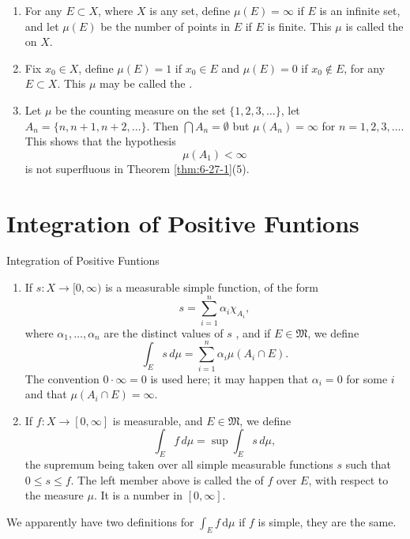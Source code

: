 \documentclass[../main.tex]{subfiles}
\begin{document}
\begin{example}{}{}
    \begin{enumerate}
\item For any $E \subset X$, where $X$ is any set, define $\mu(E) = \infty$ if $E$ is an infinite set, and let $\mu(E)$ be the number of points in $E$ if $E$ is finite. This $\mu$ is called the  on $X$.
\item Fix $x_0 \in X$, define $\mu(E) = 1$ if $x_0 \in E$ and $\mu(E) = 0$ if $x_0 \notin E$, for any $E \subset X$. This $\mu$ may be called the .
\item Let $\mu$ be the counting measure on the set $\{1, 2, 3, \dots\}$, let $A_n = \{n, n + 1, n + 2, \dots\}$. Then $\bigcap A_n = \emptyset$ but $\mu(A_n) = \infty$ for $n = 1, 2, 3, \dots$. This shows that the hypothesis
\[ \mu(A_1) < \infty \]
is not superfluous in Theorem \ref{thm:6-27-1}(5).
\end{enumerate}
\end{example}
\section{Integration of Positive Funtions}


\begin{definition}{Integration of Positive Funtions}{}
\begin{enumerate}
    \item If $s: X \to [0, \infty)$ is a measurable simple function, of the form
\[
s = \sum_{i=1}^{n} \alpha_i \chi_{A_i},
\]
where $\alpha_1, \dots, \alpha_n$ are the distinct values of $s$ , and if $E \in \mathfrak{M}$, we define
\[
\int_E s \, d\mu = \sum_{i=1}^{n} \alpha_i \mu(A_i \cap E).
\]
The convention $0 \cdot \infty = 0$ is used here; it may happen that $\alpha_i = 0$ for some $i$ and that $\mu(A_i \cap E) = \infty$.
\item If $f: X \to [0, \infty]$ is measurable, and $E \in \mathfrak{M}$, we define
\[
\int_E f \, d\mu = \sup \int_E s \, d\mu,
\]
the supremum being taken over all simple measurable functions $s$ such that $0 \le s \le f$.
The left member above is called the  of $f$ over $E$, with respect to the measure $\mu$. It is a number in $[0, \infty]$.
\end{enumerate}

\end{definition}
\begin{remark}
    We apparently have two definitions for \(  \int_{E}f\,\mathrm{d} \mu   \) if \(  f   \) is simple, they are the same.  
\end{remark}
\end{document}
